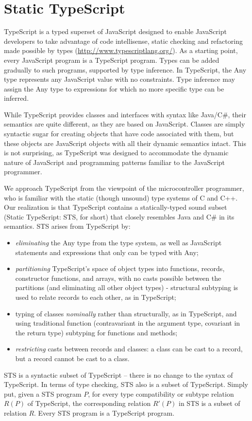 \section{Static TypeScript}
\label{sec:sts}

TypeScript is a typed superset of JavaScript designed to enable JavaScript developers to take advantage of code 
intellisense, static checking and refactoring made possible by types (\url{http://www.typescriptlang.org/}). 
As a starting point, every JavaScript program is a TypeScript program.  Types can be added gradually to such programs, 
supported by type inference. In TypeScript, the Any type 
represents any JavaScript value with no constraints. Type inference may assign the Any type to expressions for which 
no more specific type can be inferred.

While TypeScript provides classes and interfaces with syntax like Java/C\#, their semantics
are quite different, as they are based on JavaScript.  Classes are simply syntactic sugar for creating objects that
have code associated with them, but these objects are JavaScript objects with all their dynamic semantics intact. This
is not surprising, as TypeScript was designed to accommodate the dynamic nature of JavaScript and programming patterns
familiar to the JavaScript programmer. 

We approach TypeScript from the viewpoint of the microcontroller programmer, who is 
familiar with the static (though unsound) type systems of C and C++. Our realization is that TypeScript contains a
statically-typed sound subset (Static TypeScript: STS, for short) that closely resembles Java and C\# in its semantics.
STS arises from TypeScript by:
\begin{itemize}
\item \emph{eliminating} the Any type from the type system, as well as JavaScript statements
and expressions that only can be typed with Any;
\item \emph{partitioning} TypeScript's space of object types into functions, records, constructor functions, and arrays, with no casts 
    possible between the partitions (and eliminating all other object types) - structural subtyping is used to relate records 
    to each other, as in TypeScript;
\item typing of classes \emph{nominally} rather than structurally, as in TypeScript, and using traditional function (contravariant 
    in the argument type, covariant in the return type) subtyping for functions and methods;
\item \emph{restricting} casts between records and classes: a class can be cast to a record, but a record cannot be cast to a class.
\end{itemize}
STS is a syntactic subset of TypeScript -- there is no change to the syntax of TypeScript.
In terms of type checking, STS also is a subset of TypeScript. Simply put, given a STS program $P$,
for every type compatibility or subtype relation $R(P)$ of TypeScript, the corresponding relation $R'(P)$ in STS
is a subset of relation $R$. Every STS program is a TypeScript program. 

